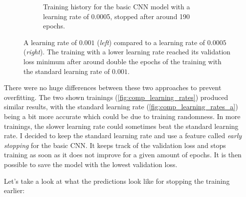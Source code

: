 \begin{figure}[H]
\begin{subfigure}{.46\textwidth}
\caption{Training history for the basic CNN model with a learning rate of 0.0005, stopped after around 190 epochs.} 
\label{fig:comp_learning_rates_b}
\end{subfigure}
\caption{A learning rate of $0.001$ (\textit{left}) compared to a learning rate of $0.0005$ (\textit{right}). The training with a lower learning rate reached its validation loss minimum after around double the epochs of the training with the standard learning rate of $0.001$.}
\label{fig:comp_learning_rates}
\end{figure}

There were no huge differences between these two approaches to prevent overfitting. The two shown trainings (\autoref{fig:comp_learning_rates}) produced similar results, with the standard learning rate (\autoref{fig:comp_learning_rates_a}) being a bit more accurate which could be due to training randomness. In more trainings, the slower learning rate could sometimes beat the standard learning rate. I decided to keep the standard learning rate and use a feature called \textit{early stopping} for the basic CNN. It keeps track of the validation loss and stops training as soon as it does not improve for a given amount of epochs. It is then possible to save the model with the lowest validation loss.

Let's take a look at what the predictions look like for stopping the training earlier:

